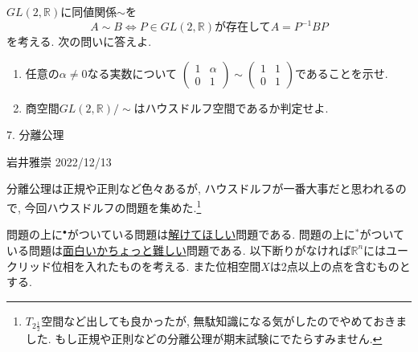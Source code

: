 \documentclass[dvipdfmx,a4paper,11pt]{article}
\newcommand{\R}{\mathbb{R}}
\newcommand{\C}{\mathbb{C}}
\theoremstyle{definition}
\begin{document}
\begin{enumerate}[ label=\textbf{問}6.\arabic*]
$GL(2, \R) $に同値関係$\sim$を
$$
	A \sim B \Leftrightarrow \text{$P \in GL(2, \R)$が存在して$A = P^{-1} B P$}
	$$
を考える. 次の問いに答えよ.
	\begin{enumerate}
	\item 任意の$\alpha \neq 0$なる実数について
$\begin{pmatrix} 1& \alpha\\0& 1\end{pmatrix} \sim \begin{pmatrix} 1 & 1\\0& 1\end{pmatrix}$であることを示せ.
	\item 商空間$GL(2, \R)/\sim$はハウスドルフ空間であるか判定せよ.
	\end{enumerate}
	
 \end{enumerate}


\newpage


\begin{center}
{\Large 7. 分離公理}
\end{center}

\begin{flushright}
 岩井雅崇 2022/12/13
\end{flushright}

分離公理は正規や正則など色々あるが, ハウスドルフが一番大事だと思われるので, 今回ハウスドルフの問題を集めた.\footnote{$T_{2 \frac{1}{2}}$空間など出しても良かったが, 無駄知識になる気がしたのでやめておきました. もし正規や正則などの分離公理が期末試験にでたらすみません.}

問題の上に$^{\bullet}$がついている問題は\underline{解けてほしい}問題である. 問題の上に$^{*}$がついている問題は\underline{面白いかちょっと難しい}問題である.  以下断りがなければ$\R^{n}$にはユークリッド位相を入れたものを考える. また位相空間$X$は2点以上の点を含むものとする.
\end{document}
